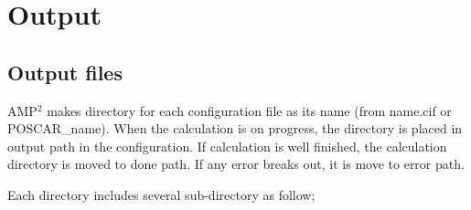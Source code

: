 \documentclass[letterpaper,10pt,english]{sphinxmanual}
\begin{document}
\begin{sphinxVerbatim}[commandchars=\\\{\}]
                           
     
     
               
                   
\end{sphinxVerbatim}


\chapter{Output}
\label{\detokenize{Output/Output:output}}\label{\detokenize{Output/Output::doc}}

\section{Output files}
\label{\detokenize{Output/Output:output-files}}
AMP$^{\text{2}}$ makes directory for each configuration file as its name (from name.cif or POSCAR\_name).
When the calculation is on progress, the directory is
placed in output path in the configuration. If calculation is well finished, the calculation directory
is moved to done path. If any error breaks out, it is move to error path.

Each directory includes several sub-directory as follow;
\end{document}
